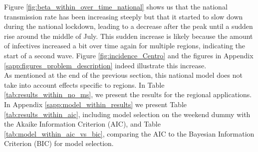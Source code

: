 \documentclass[12pt]{article}
\begin{document}
	Figure \ref{fig:beta_within_over_time_national} shows us that the national transmission rate has been increasing steeply but that it started to slow down during the national lockdown, leading to a decrease after the peak until a sudden rise around the middle of July. This sudden increase is likely because the amount of infectives increased a bit over time again for multiple regions, indicating the start of a second wave. Figure \ref{fig:incidence_Centro} and the figures in Appendix \ref{sapp:figures_problem_description} indeed illustrate this increase. \\
	
	As mentioned at the end of the previous section, this national model does not take into account effects specific to regions. In Table \ref{tab:results_within_no_ms}, we present the results for the regional applications. In Appendix \ref{sapp:model_within_results} we present Table \ref{tab:results_within_aic}, including model selection on the weekend dummy with the Akaike Information Criterion (AIC), and Table \ref{tab:model_within_aic_vs_bic}, comparing the AIC to the Bayesian Information Criterion (BIC) for model selection.
	
	\newpage
	\setlength{\LTleft}{-20cm plus -1fill}
    \setlength{\LTright}{\LTleft}
	
\end{document}
